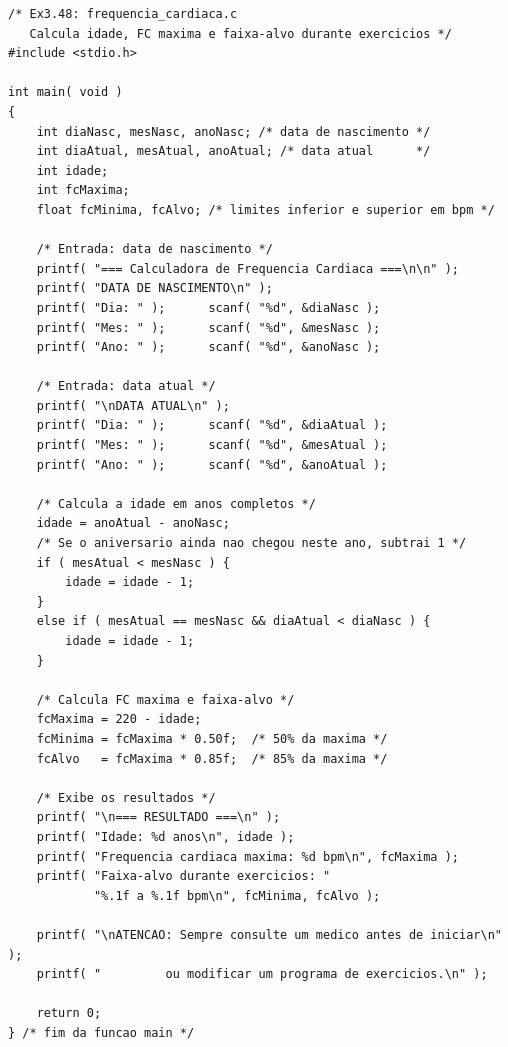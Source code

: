 \documentclass[12pt,a4paper]{article}
\begin{document}
\begin{respostabox}
\begin{lstlisting}
/* Ex3.48: frequencia_cardiaca.c
   Calcula idade, FC maxima e faixa-alvo durante exercicios */
#include <stdio.h>

int main( void )
{
    int diaNasc, mesNasc, anoNasc; /* data de nascimento */
    int diaAtual, mesAtual, anoAtual; /* data atual      */
    int idade;
    int fcMaxima;
    float fcMinima, fcAlvo; /* limites inferior e superior em bpm */

    /* Entrada: data de nascimento */
    printf( "=== Calculadora de Frequencia Cardiaca ===\n\n" );
    printf( "DATA DE NASCIMENTO\n" );
    printf( "Dia: " );      scanf( "%d", &diaNasc );
    printf( "Mes: " );      scanf( "%d", &mesNasc );
    printf( "Ano: " );      scanf( "%d", &anoNasc );

    /* Entrada: data atual */
    printf( "\nDATA ATUAL\n" );
    printf( "Dia: " );      scanf( "%d", &diaAtual );
    printf( "Mes: " );      scanf( "%d", &mesAtual );
    printf( "Ano: " );      scanf( "%d", &anoAtual );

    /* Calcula a idade em anos completos */
    idade = anoAtual - anoNasc;
    /* Se o aniversario ainda nao chegou neste ano, subtrai 1 */
    if ( mesAtual < mesNasc ) {
        idade = idade - 1;
    }
    else if ( mesAtual == mesNasc && diaAtual < diaNasc ) {
        idade = idade - 1;
    }

    /* Calcula FC maxima e faixa-alvo */
    fcMaxima = 220 - idade;
    fcMinima = fcMaxima * 0.50f;  /* 50% da maxima */
    fcAlvo   = fcMaxima * 0.85f;  /* 85% da maxima */

    /* Exibe os resultados */
    printf( "\n=== RESULTADO ===\n" );
    printf( "Idade: %d anos\n", idade );
    printf( "Frequencia cardiaca maxima: %d bpm\n", fcMaxima );
    printf( "Faixa-alvo durante exercicios: "
            "%.1f a %.1f bpm\n", fcMinima, fcAlvo );

    printf( "\nATENCAO: Sempre consulte um medico antes de iniciar\n" );
    printf( "         ou modificar um programa de exercicios.\n" );

    return 0;
} /* fim da funcao main */
\end{lstlisting}


\end{respostabox}
\end{document}

